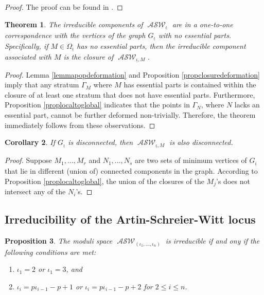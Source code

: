 \documentclass{compositio}
\newtheorem{theorem}{Theorem}[section]
\newtheorem{proposition}[theorem]{Proposition}
\newtheorem{corollary}[theorem]{Corollary}
\theoremstyle{remark}
\theoremstyle{remark}
\DeclareMathOperator{\ASW}{\mathcal{ASW}}
\begin{document}
\begin{proof}
The proof can be found in \cite[Proposition 3.4]{DANG2020398}.
\end{proof}



\begin{theorem}
\label{theoremirredcomponent}
The irreducible components of $\ASW_{\underline{\iota}}$ are in a one-to-one correspondence with the vertices of the graph $G_{\underline{\iota}}$ with no essential parts. Specifically, if $M \in \Omega_{\underline{\iota}}$ has no essential parts, then the irreducible component associated with $M$ is the closure of $\ASW_{\underline{\iota},M}$.
\end{theorem}

\begin{proof}
Lemma \ref{lemmapopdeformation} and Proposition \ref{propclosuredeformation} imply that any stratum $\Gamma_M$ where $M$ has essential parts is contained within the closure of at least one stratum that does not have essential parts. Furthermore, Proposition \ref{proplocaltoglobal} indicates that the points in $\Gamma_N$, where $N$ lacks an essential part, cannot be further deformed non-trivially. Therefore, the theorem immediately follows from these observations.
\end{proof}

\begin{corollary}
If $G_{\underline{\iota}}$ is disconnected, then $\ASW_{\underline{\iota},M}$ is also disconnected.
\end{corollary}

\begin{proof}
Suppose ${M_1, \ldots, M_r}$ and ${N_1, \ldots, N_s}$ are two sets of minimum vertices of $G_{\underline{\iota}}$ that lie in different (union of) connected components in the graph. According to Proposition \ref{proplocaltoglobal}, the union of the closures of the $M_j$'s does not intersect any of the $N_i$'s. 
\end{proof}



\subsection{Irreducibility of the Artin-Schreier-Witt locus}

\begin{proposition}
The moduli space $\ASW_{(\iota_1, \ldots, \iota_n)}$ is irreducible if and ony if the following conditions are met:
\begin{enumerate}[label*=\arabic*.]
    \item $\iota_1=2$ or $\iota_1=3$, and
    \item $\iota_{i}=p\iota_{i-1}-p+1$ or $\iota_{i}=p\iota_{i-1}-p+2$ for $2 \le i \le n$.
\end{enumerate}
\end{proposition}
\end{document}
